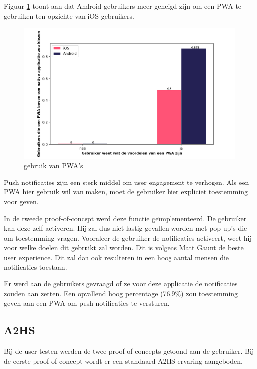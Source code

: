 		Figuur \ref{fig:gebruikPWA}  toont aan dat Android gebruikers meer geneigd zijn om een PWA te gebruiken ten opzichte van iOS gebruikers.
		
		
		\begin{figure}[H]
			\centering
			\includegraphics[width=120mm]{./img/PWA_over_Native.png}
			\caption{gebruik van PWA's}
			\label{fig:gebruikPWA}
			
		\end{figure}

		
		Push notificaties zijn een sterk middel om user engagement te verhogen. \autocite{Gaunt2020} Als een PWA hier gebruik wil van maken, moet de gebruiker hier expliciet toestemming voor geven. 
		
		In de tweede proof-of-concept werd deze functie geïmplementeerd. De gebruiker kan deze zelf activeren. Hij zal dus niet lastig gevallen worden met pop-up's die om toestemming vragen. Vooraleer de gebruiker de notificaties activeert, weet hij voor welke doelen dit gebruikt zal worden. Dit is volgens Matt Gaunt de beste user experience. Dit zal dan ook resulteren in een hoog aantal mensen die notificaties toestaan. \autocite{Gaunt2019c}
		
		Er werd aan de gebruikers gevraagd of ze voor deze applicatie de notificaties zouden aan zetten. Een opvallend hoog percentage (76,9\%) zou toestemming geven aan een PWA om push notificaties te versturen.
		
		
		
	\subsection{A2HS}
		Bij de user-testen werden de twee proof-of-concepts getoond aan de gebruiker. Bij de eerste proof-of-concept wordt er een standaard A2HS ervaring aangeboden.
		
